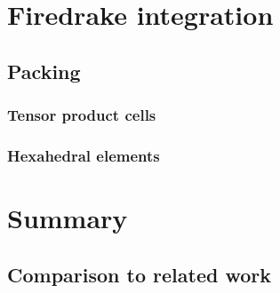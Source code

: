 \documentclass[thesis]{subfiles}
\begin{document}


\chapter{Firedrake integration}




\section{Packing}
\subsection{Tensor product cells}
\subsection{Hexahedral elements}



\chapter{Summary}

\section{Comparison to related work}
\end{document}
